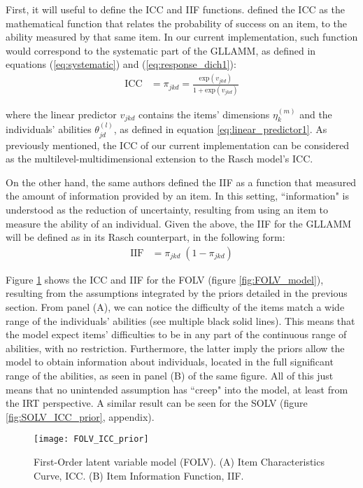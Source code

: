 First, it will useful to define the ICC and IIF functions. \citet{Hambleton_et_al_1991b} defined the ICC as the mathematical function that relates the probability of success on an item, to the ability measured by that same item. In our current implementation, such function would correspond to the systematic part of the GLLAMM, as defined in equations (\ref{eq:systematic}) and (\ref{eq:response_dich1}):
%
\begin{equation} \label{eq:ICC}
	\begin{split}
		\text{ICC} &= \pi_{jkd} = \frac{ \text{exp}(v_{jkd}) }{ 1 + \text{exp}(v_{jkd}) }
	\end{split}	
\end{equation}

\noindent where the linear predictor $v_{jkd}$ contains the items' dimensions $\eta^{(m)}_{k}$ and the individuals' abilities $\theta^{(l)}_{jd}$, as defined in equation \ref{eq:linear_predictor1}. As previously mentioned, the ICC of our current implementation can be considered as the multilevel-multidimensional extension to the Rasch model's ICC.

On the other hand, the same authors defined the IIF as a function that measured the amount of information provided by an item. In this setting, ``information" is understood as the reduction of uncertainty, resulting from using an item to measure the ability of an individual. Given the above, the IIF for the GLLAMM will be defined as in its Rasch counterpart, in the following form:
%
\begin{equation} \label{eq:IIF}
	\begin{split}
		\text{IIF} &= \pi_{jkd} \; (1 - \pi_{jkd})
	\end{split}	
\end{equation}

Figure \ref{fig:FOLV_ICC_prior} shows the ICC and IIF for the FOLV (figure \ref{fig:FOLV_model}), resulting from the assumptions integrated by the priors detailed in the previous section. From panel (A), we can notice the difficulty of the items match a wide range of the individuals' abilities (see multiple black solid lines). This means that the model expect items' difficulties to be in any part of the continuous range of abilities, with no restriction. Furthermore, the latter imply the priors allow the model to obtain information about individuals, located in the full significant range of the abilities, as seen in panel (B) of the same figure. All of this just means that no unintended assumption has ``creep" into the model, at least from the IRT perspective. A similar result can be seen for the SOLV (figure \ref{fig:SOLV_ICC_prior}, appendix).
%
\begin{figure}[H]
	\centering
	\texttt{[image: FOLV\_ICC\_prior]}
	\caption[First-Order latent variable model (FOLV). Item Characteristic Curve (ICC) and Item Information Function (IIF).]%
	{First-Order latent variable model (FOLV). (A) Item Characteristics Curve, ICC. (B) Item Information Function, IIF.}
	\label{fig:FOLV_ICC_prior}
\end{figure}

